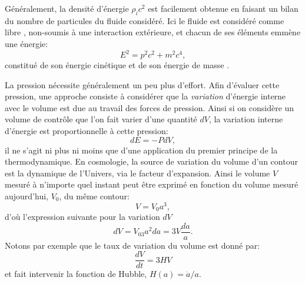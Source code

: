 Généralement, la densité d'énergie $\rho_i c^2$ est facilement obtenue en faisant un bilan du nombre de particules du fluide considéré. Ici le fluide est considéré comme libre , non-soumis à une interaction extérieure, et chacun de ses éléments emmène une énergie:
\begin{equation}
E^2=p^2c^2+m^2c^4,
\end{equation}
constitué de son énergie cinétique et de son énergie de masse .

La pression nécessite généralement un peu plus d'effort. Afin d'évaluer cette pression, une approche consiste à considérer que la \textit{variation} d'énergie interne avec le volume est due au travail des forces de pression. Ainsi si on considère un volume de contrôle que l'on fait varier d'une quantité $dV$, la variation interne d'énergie est proportionnelle à cette pression:
\begin{equation}
dE=-PdV,
\label{e:therm1}
\end{equation}
il ne s'agit ni plus ni moins que d'une application du premier principe de la thermodynamique. En cosmologie, la source de variation du volume d'un contour est la dynamique de l'Univers, via le facteur d'expansion. Ainsi le volume $V$ mesuré à n'importe quel instant peut être exprimé en fonction du volume mesuré aujourd'hui, $V_0$, du même contour:
\begin{equation}
V=V_0a^3,
\end{equation}
d'où l'expression suivante pour la variation $dV$
\begin{equation}
dV=V_03a^2da=3V\frac{da}{a}.
\label{e:dV}
\end{equation}
Notons par exemple que le taux de variation du volume est donné par:
\begin{equation}
\frac{dV}{dt}=3HV
\end{equation}
et fait intervenir la fonction de Hubble, $H(a)=\dot a/a$.

